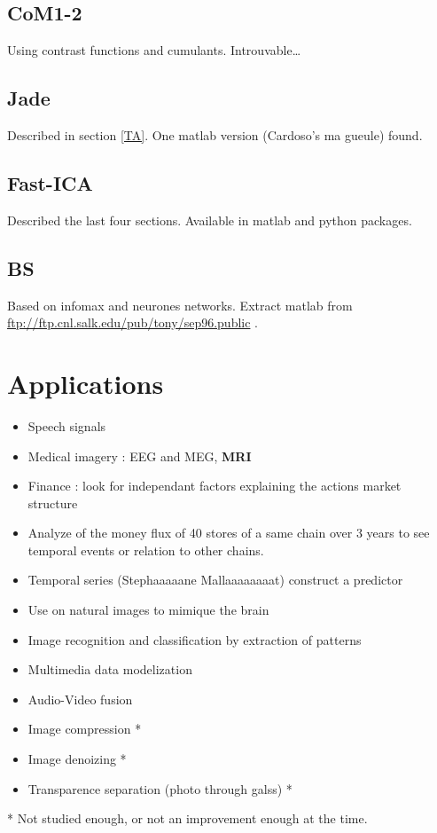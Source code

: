 \documentclass[a4paper,11pt,titlepage]{article}
\begin{document}
\subsection{CoM1-2}
Using contrast functions and cumulants. Introuvable\dots
\subsection{Jade}
Described in section \ref{TA}. One matlab version (Cardoso's ma gueule) found.
\subsection{Fast-ICA}
Described the last four sections. Available in matlab and python packages.
\subsection{BS}
Based on infomax and neurones networks. Extract matlab from \\\url{ftp://ftp.cnl.salk.edu/pub/tony/sep96.public} .
\section{Applications}
	\begin{itemize}
		\item Speech signals
		\item Medical imagery : EEG and MEG, \bf{MRI}
		\item Finance : look for independant factors explaining the actions market structure
		\item Analyze of the money flux of 40 stores of a same chain over 3 years to see temporal events or relation to other chains.
		\item Temporal series (Stephaaaaane Mallaaaaaaaat) construct a predictor
		\item Use on natural images to mimique the brain 
		\item Image recognition and classification by extraction of patterns
		\item Multimedia data modelization
		\item Audio-Video fusion
		\item Image compression *
		\item Image denoizing *
		\item Transparence separation (photo through galss) *
	\end{itemize}
* Not studied enough, or not an improvement enough at the time.
\end{document}
